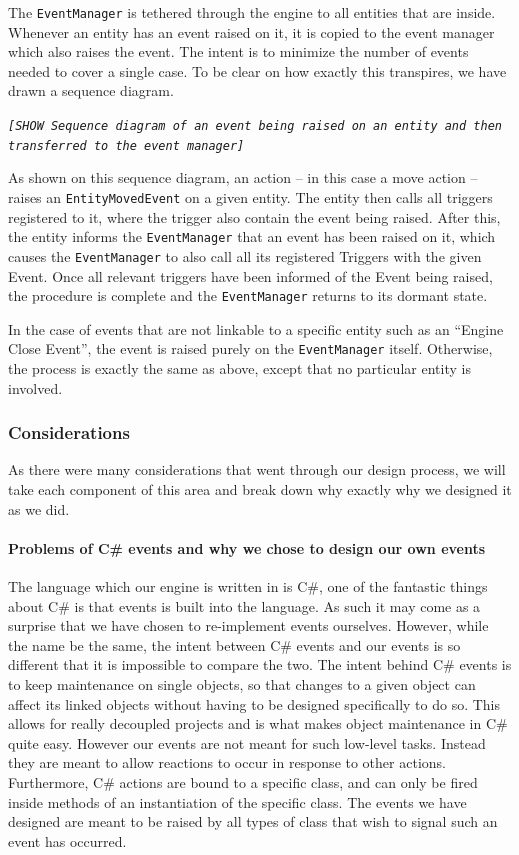The \texttt{EventManager} is tethered through the engine to all entities
that are inside. Whenever an entity has an event raised on it, it
is copied to the event manager which also raises the event. The intent
is to minimize the number of events needed to cover a single case.
To be clear on how exactly this transpires, we have drawn a sequence
diagram.

\texttt{\emph{{[}SHOW Sequence diagram of an event being raised on
an entity and then transferred to the event manager{]}}}

As shown on this sequence diagram, an action -- in this case a move
action -- raises an \texttt{EntityMovedEvent} on a given entity. The
entity then calls all triggers registered to it, where the trigger
also contain the event being raised. After this, the entity informs
the \texttt{EventManager} that an event has been raised on it, which
causes the \texttt{EventManager} to also call all its registered Triggers
with the given Event. Once all relevant triggers have been informed
of the Event being raised, the procedure is complete and the \texttt{EventManager}
returns to its dormant state.

In the case of events that are not linkable to a specific entity such
as an \textquotedblleft{}Engine Close Event\textquotedblright{}, the
event is raised purely on the \texttt{EventManager} itself. Otherwise,
the process is exactly the same as above, except that no particular
entity is involved.


\subsubsection*{Considerations}

As there were many considerations that went through our design process,
we will take each component of this area and break down why exactly
why we designed it as we did.


\paragraph*{Problems of C\# events and why we chose to design our own events}

The language which our engine is written in is C\#, one of the fantastic
things about C\# is that events is built into the language. As such
it may come as a surprise that we have chosen to re-implement events
ourselves. However, while the name be the same, the intent between
C\# events and our events is so different that it is impossible to
compare the two. The intent behind C\# events is to keep maintenance
on single objects, so that changes to a given object can affect its
linked objects without having to be designed specifically to do so.
This allows for really decoupled projects and is what makes object
maintenance in C\# quite easy. However our events are not meant for
such low-level tasks. Instead they are meant to allow reactions to
occur in response to other actions. Furthermore, C\# actions are bound
to a specific class, and can only be fired inside methods of an instantiation
of the specific class. The events we have designed are meant to be
raised by all types of class that wish to signal such an event has
occurred.


